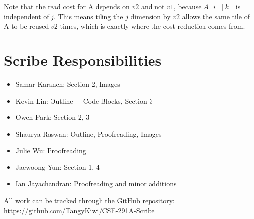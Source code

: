 \documentclass[twoside]{article}
\begin{document}
Note that the read cost for A depends on $v2$ and not $v1$, because $A[i][k]$ is independent of $j$. This means tiling the $j$ dimension by $v2$ allows the same tile of A to be reused $v2$ times, which is exactly where the cost reduction comes from.

\section*{Scribe Responsibilities}
\begin{itemize}
    \item{Samar Karanch}: Section 2, Images
    \item{Kevin Lin}: Outline + Code Blocks, Section 3 
    \item{Owen Park}: Section 2, 3
    \item{Shaurya Raswan}: Outline, Proofreading, Images
    \item{Julie Wu}: Proofreading
    \item{Jaewoong Yun}: Section 1, 4
    \item{Ian Jayachandran}: Proofreading and minor additions
\end{itemize}
All work can be tracked through the GitHub repository: \href{https://github.com/TangyKiwi/CSE-291A-Scribe}{https://github.com/TangyKiwi/CSE-291A-Scribe}
\end{document}
